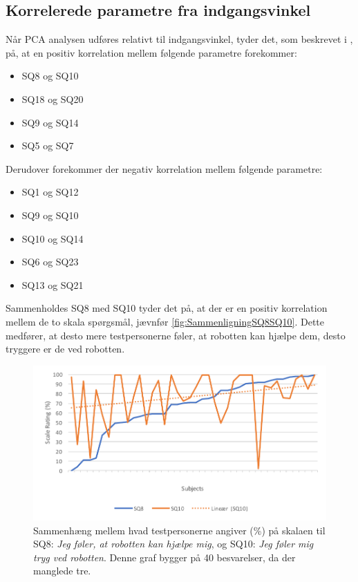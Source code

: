 \subsection{Korrelerede parametre fra indgangsvinkel}
\label{DatabehandlingSammenligningKorreleredeIndgangsvinkel}
%
Når PCA analysen udføres relativt til indgangsvinkel, tyder det, som beskrevet i , på, at en positiv korrelation mellem følgende parametre forekommer:
%
\begin{itemize}
	\item SQ8 og SQ10
	\item SQ18 og SQ20
	\item SQ9 og SQ14
	\item SQ5 og SQ7\blankline
\end{itemize}
\noindent
%
Derudover forekommer der negativ korrelation mellem følgende parametre:
%
\begin{itemize}
	\item SQ1 og SQ12
	\item SQ9 og SQ10
	\item SQ10 og SQ14
	\item SQ6 og SQ23
	\item SQ13 og SQ21\blankline
\end{itemize}
\noindent
%
Sammenholdes SQ8 med SQ10 tyder det på, at der er en positiv korrelation mellem de to skala spørgsmål, jævnfør \autoref{fig:SammenligningSQ8SQ10}. Dette medfører, at desto mere testpersonerne føler, at robotten kan hjælpe dem, desto tryggere er de ved robotten.
%
\begin{figure}[H]
	\centering
	\includegraphics[width=\textwidth]{Figure/Korrelationsgrafer/SQ8+SQ10}
	\caption{Sammenhæng mellem hvad testpersonerne angiver (\%) på skalaen til SQ8: \textit{Jeg føler, at robotten kan hjælpe mig}, og SQ10: \textit{Jeg føler mig tryg ved robotten}. Denne graf bygger på 40 besvarelser, da der manglede tre.}
	\label{fig:SammenligningSQ8SQ10}
\end{figure}
